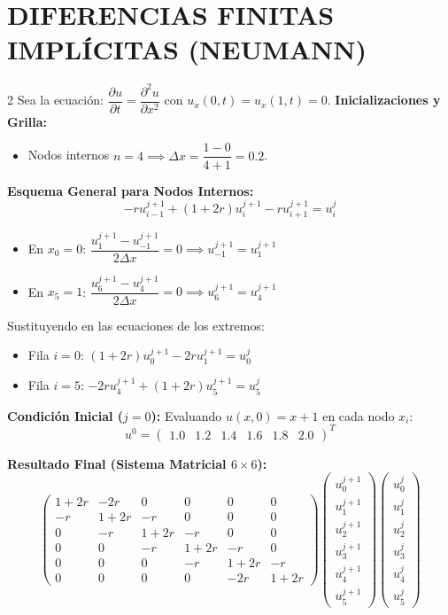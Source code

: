 \documentclass[10pt]{extarticle}
\newenvironment{term}
  {\begin{minipage}{\linewidth}}
  {\end{minipage}\par}
\begin{document}
\section*{DIFERENCIAS FINITAS IMPLÍCITAS (NEUMANN)}
\begin{multicols}{2}
Sea la ecuación: $\dfrac{\partial u}{\partial t} = \dfrac{\partial^2 u}{\partial x^2}$ con $u_x(0,t)=u_x(1,t)=0$.
\textbf{Inicializaciones y Grilla:}
\begin{itemize}[leftmargin=1.2em]
    \item Nodos internos $n = 4 \implies \Delta x = \dfrac{1 - 0}{4 + 1} = 0.2$.
\end{itemize}
\textbf{Esquema General para Nodos Internos:}
$$-r u_{i-1}^{j+1} + (1 + 2r)u_i^{j+1} - r u_{i+1}^{j+1} = u_i^j$$
\begin{itemize}[leftmargin=1.2em]
    \item En $x_0 = 0$: $\dfrac{u_1^{j+1} - u_{-1}^{j+1}}{2\Delta x} = 0 \implies u_{-1}^{j+1} = u_1^{j+1}$
    \item En $x_5 = 1$: $\dfrac{u_6^{j+1} - u_4^{j+1}}{2\Delta x} = 0 \implies u_6^{j+1} = u_4^{j+1}$
\end{itemize}
Sustituyendo en las ecuaciones de los extremos:
\begin{itemize}[leftmargin=1.2em]
    \item Fila $i=0$: $(1 + 2r)u_0^{j+1} - 2r u_1^{j+1} = u_0^j$
    \item Fila $i=5$: $-2r u_4^{j+1} + (1 + 2r)u_5^{j+1} = u_5^j$
\end{itemize}\textbf{Condición Inicial ($j = 0$):}
Evaluando $u(x,0) = x + 1$ en cada nodo $x_i$:$$u^0 = 
\begin{pmatrix} 
    1.0 & 1.2 & 1.4 & 1.6 & 1.8 & 2.0 
\end{pmatrix}^T$$

\end{multicols}
\begin{term}
\textbf{Resultado Final (Sistema Matricial $6 \times 6$):}
$$\begin{pmatrix}
1+2r & -2r & 0 & 0 & 0 & 0 \\
-r & 1+2r & -r & 0 & 0 & 0 \\
0 & -r & 1+2r & -r & 0 & 0 \\
0 & 0 & -r & 1+2r & -r & 0 \\
0 & 0 & 0 & -r & 1+2r & -r \\
0 & 0 & 0 & 0 & -2r & 1+2r
\end{pmatrix}
\begin{pmatrix}
u_0^{j+1} \\ u_1^{j+1} \\ u_2^{j+1} \\ u_3^{j+1} \\ u_4^{j+1} \\ u_5^{j+1}
\end{pmatrix}\begin{pmatrix}u_0^j \\ u_1^j \\ u_2^j \\ u_3^j \\ u_4^j \\ u_5^j\end{pmatrix}$$\end{term}
\end{document}
